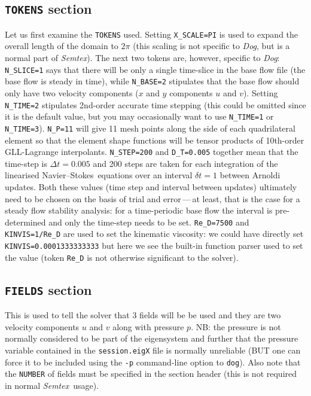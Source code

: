 \documentclass[11pt,a4paper]{report}
\newcommand\NavSto{Navier--Stokes}
\newcommand{\Semtex}{\emph{Semtex}}
\newcommand{\Dog}{\emph{Dog}}
\begin{document}
\subsection{\texttt{TOKENS} section}

Let us first examine the \verb+TOKENS+ used.  Setting
\verb+X_SCALE=PI+ is used to expand the overall length of the domain
to $2\pi$ (this scaling is not specific to \Dog, but is a normal part
of \Semtex).  
%
The next two tokens are, however, specific to \Dog: \verb+N_SLICE=1+
says that there will be only a single time-slice in the base flow file
(the base flow is steady in time), while \verb+N_BASE=2+ stipulates
that the base flow should only have two velocity components ($x$ and
$y$ components $u$ and $v$).
%
Setting \verb+N_TIME=2+ stipulates 2nd-order accurate time stepping
(this could be omitted since it is the default value, but you may
occasionally want to use \verb+N_TIME=1+ or
\verb+N_TIME=3+). \verb+N_P=11+ will give 11 mesh points along the
side of each quadrilateral element so that the element shape functions
will be tensor products of 10th-order GLL-Lagrange interpolants.
%
\verb+N_STEP=200+ and \verb+D_T=0.005+ together mean that the
time-step is $\Delta t=0.005$ and 200 steps are taken for each
integration of the linearised \NavSto\ equations over an interval
$\delta t=1$ between Arnoldi updates.  Both these values (time step
and interval between updates) ultimately need to be chosen on the
basis of trial and error\,---\,at least, that is the case for a steady
flow stability analysis: for a time-periodic base flow the interval is
pre-determined and only the time-step needs to be set.
%
\verb+Re_D=7500+ and \verb+KINVIS=1/Re_D+ are used to set the
kinematic viscosity: we could have directly set
\verb+KINVIS=0.0001333333333+ but here we see the built-in function
parser used to set the value (token \verb+Re_D+ is not otherwise
significant to the solver).

\subsection{\texttt{FIELDS} section}

This is used to tell the solver that 3 fields will be be used and they
are two velocity components $u$ and $v$ along with pressure $p$.  NB:
the pressure is not normally considered to be part of the eigensystem
and further that the pressure variable contained in the
\verb+session.eigX+ file is normally unreliable (BUT one can force it
to be included using the \verb+-p+ command-line option to
\verb+dog+). Also note that the \verb+NUMBER+ of fields must be
specified in the section header (this is not required in normal
\Semtex\ usage).
\end{document}
